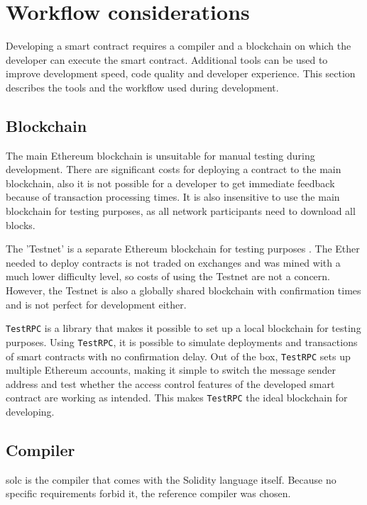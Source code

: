 \section{Workflow considerations}
Developing a smart contract requires a compiler and a blockchain on which the developer can execute the smart contract. Additional tools can be used to improve development speed, code quality and developer experience. This section describes the tools and the workflow used during development.

\subsection{Blockchain}

The main Ethereum blockchain is unsuitable for manual testing during development. There are significant costs for deploying a contract to the main blockchain, also it is not possible for a developer to get immediate feedback because of transaction processing times. It is also insensitive to use the main blockchain for testing purposes, as all network participants need to download all blocks.

The 'Testnet' is a separate Ethereum blockchain for testing purposes \cite{Testnet}. The Ether needed to deploy contracts is not traded on exchanges and was mined with a much lower difficulty level, so costs of using the Testnet are not a concern. However, the Testnet is also a globally shared blockchain with confirmation times and is not perfect for development either. 

\texttt{TestRPC} \cite{TestRPC} is a library that makes it possible to set up a local blockchain for testing purposes. Using \texttt{TestRPC}, it is possible to simulate deployments and transactions of smart contracts with no confirmation delay. Out of the box, \texttt{TestRPC} sets up multiple Ethereum accounts, making it simple to switch the message sender address and test whether the access control features of the developed smart contract are working as intended. This makes \texttt{TestRPC} the ideal blockchain for developing.

\subsection{Compiler}

solc \cite{Solc} is the compiler that comes with the Solidity language itself. Because no specific requirements forbid it, the reference compiler was chosen. 

